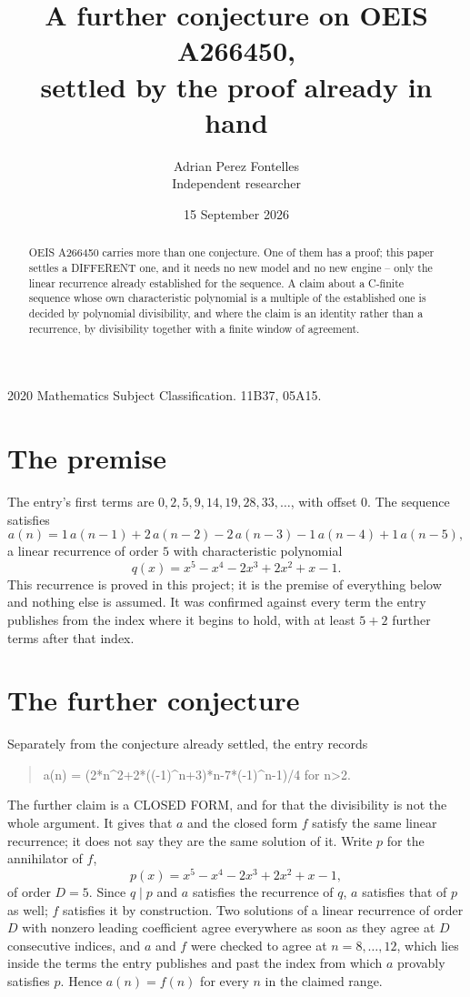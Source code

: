 \documentclass[11pt,a4paper]{article}
\title{A further conjecture on OEIS A266450,\\ \large settled by the proof already in hand}
\author{Adrian Perez Fontelles\\ \small Independent researcher}
\date{15 September 2026}
\theoremstyle{plain}
\theoremstyle{definition}
\begin{document}
\maketitle

\begin{abstract}
OEIS A266450 carries more than one conjecture. One of them has a proof; this paper settles a
DIFFERENT one, and it needs no new model and no new engine -- only the linear recurrence already
established for the sequence. A claim about a C-finite sequence whose own characteristic
polynomial is a multiple of the established one is decided by polynomial divisibility, and where
the claim is an identity rather than a recurrence, by divisibility together with a finite window
of agreement.
\end{abstract}

\noindent\small 2020 Mathematics Subject Classification. 11B37, 05A15.\normalsize

\section{The premise}

The entry's first terms are $0, 2, 5, 9, 14, 19, 28, 33,\dots$, with offset $0$. The sequence satisfies
\[
  a(n)=1\,a(n-1) + 2\,a(n-2) - 2\,a(n-3) - 1\,a(n-4) + 1\,a(n-5) ,
\]
a linear recurrence of order $5$ with characteristic polynomial
\[
  q(x)=x^{5} - x^{4} - 2 x^{3} + 2 x^{2} + x - 1 .
\]
This recurrence is proved in this project; it is the premise of everything below and nothing else is assumed.
It was confirmed against every term the entry publishes from the index where it begins to hold,
with at least $5+2$ further terms after that index.

\section{The further conjecture}

Separately from the conjecture already settled, the entry records

\begin{quote}\raggedright a(n) = (2*n\^{}2+2*((-1)\^{}n+3)*n-7*(-1)\^{}n-1)/4 for n>2.\end{quote}

The further claim is a CLOSED FORM, and for that the divisibility is not the whole argument. It
gives that $a$ and the closed form $f$ satisfy the same linear recurrence; it does not say they
are the same solution of it. Write $p$ for the annihilator of $f$,
\[
  p(x)=x^{5} - x^{4} - 2 x^{3} + 2 x^{2} + x - 1 ,
\]
of order $D=5$. Since $q\mid p$ and $a$ satisfies the recurrence of $q$, $a$ satisfies that of
$p$ as well; $f$ satisfies it by construction. Two solutions of a linear recurrence of order $D$
with nonzero leading coefficient agree everywhere as soon as they agree at $D$ consecutive
indices, and $a$ and $f$ were checked to agree at $n=8,\dots,12$,
which lies inside the terms the entry publishes and past the index from which $a$ provably
satisfies $p$. Hence $a(n)=f(n)$ for every $n$ in the claimed range.
\end{document}
